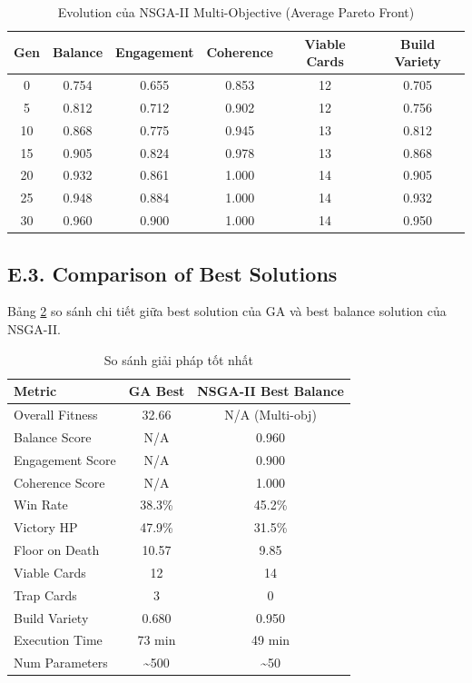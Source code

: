 \begin{table}[H]
    \centering
    \caption{Evolution của NSGA-II Multi-Objective (Average Pareto Front)}
    \label{tab:nsga2_evolution}
    \begin{tabular}{c c c c c c}
        \toprule
        \textbf{Gen} & \textbf{Balance} & \textbf{Engagement} & \textbf{Coherence} & \textbf{Viable Cards} & \textbf{Build Variety} \\
        \midrule
        0  & 0.754 & 0.655 & 0.853 & 12 & 0.705 \\
        5  & 0.812 & 0.712 & 0.902 & 12 & 0.756 \\
        10 & 0.868 & 0.775 & 0.945 & 13 & 0.812 \\
        15 & 0.905 & 0.824 & 0.978 & 13 & 0.868 \\
        20 & 0.932 & 0.861 & 1.000 & 14 & 0.905 \\
        25 & 0.948 & 0.884 & 1.000 & 14 & 0.932 \\
        30 & 0.960 & 0.900 & 1.000 & 14 & 0.950 \\
        \bottomrule
    \end{tabular}
\end{table}

\subsection*{E.3. Comparison of Best Solutions}

Bảng \ref{tab:best_solutions} so sánh chi tiết giữa best solution của GA và best balance solution của NSGA-II.

\begin{table}[H]
    \centering
    \caption{So sánh giải pháp tốt nhất}
    \label{tab:best_solutions}
    \begin{tabular}{l c c}
        \toprule
        \textbf{Metric} & \textbf{GA Best} & \textbf{NSGA-II Best Balance} \\
        \midrule
        Overall Fitness & 32.66 & N/A (Multi-obj) \\
        Balance Score & N/A & 0.960 \\
        Engagement Score & N/A & 0.900 \\
        Coherence Score & N/A & 1.000 \\
        \addlinespace
        Win Rate & 38.3\% & 45.2\% \\
        Victory HP & 47.9\% & 31.5\% \\
        Floor on Death & 10.57 & 9.85 \\
        \addlinespace
        Viable Cards & 12 & 14 \\
        Trap Cards & 3 & 0 \\
        Build Variety & 0.680 & 0.950 \\
        \addlinespace
        Execution Time & 73 min & 49 min \\
        Num Parameters & \textasciitilde 500 & \textasciitilde 50 \\
        \bottomrule
    \end{tabular}
\end{table}


